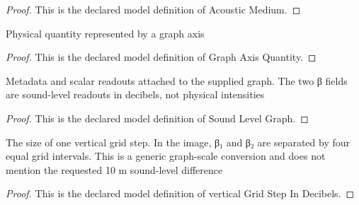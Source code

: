 \begin{proof}
  This is the declared model definition of Acoustic Medium.
\end{proof}
\begin{definition}
  \label{def:physics:phyx-mini-0317:phyxminiproblems-problemphyxmini0317-graphaxisquantity}
  Physical quantity represented by a graph axis
\end{definition}
\begin{proof}
  This is the declared model definition of Graph Axis Quantity.
\end{proof}
\begin{definition}
  \label{def:physics:phyx-mini-0317:phyxminiproblems-problemphyxmini0317-soundlevelgraph}
  Metadata and scalar readouts attached to the supplied graph. The two β fields are sound-level readouts in decibels, not physical intensities
\end{definition}
\begin{proof}
  This is the declared model definition of Sound Level Graph.
\end{proof}
\begin{definition}
  \label{def:physics:phyx-mini-0317:phyxminiproblems-problemphyxmini0317-verticalgridstepindecibels}
  The size of one vertical grid step. In the image, β₁ and β₂ are separated by four equal grid intervals. This is a generic graph-scale conversion and does not mention the requested 10 m sound-level difference
\end{definition}
\begin{proof}
  This is the declared model definition of vertical Grid Step In Decibels.
\end{proof}
